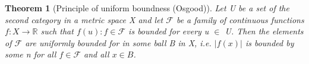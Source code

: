 \documentclass{article}
\newtheorem*{theorem}{Theorem}
\begin{document}
\begin{theorem}[Principle of uniform boundness (Osgood)] Let U be a set of the second category in a metric space X and let $\mathcal{F}$ be a family of continuous functions $f: X \rightarrow \mathbb{R}$ such that {$f(u): f \in \mathcal{F}$} is bounded for every u $\in$ U. Then the elements of $\mathcal{F}$ are uniformly bounded for in some ball B in X, i.e. $\vert f(x) \vert$ is bounded by some n for all $f \in \mathcal{F}$ and all $x \in B$.
\end{theorem}
\end{document}

